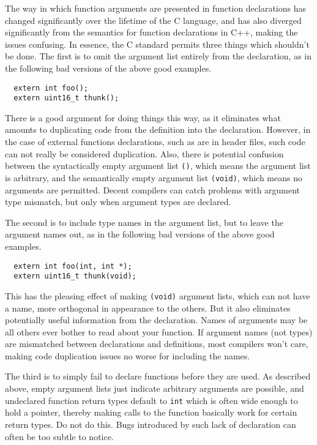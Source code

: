 \documentclass{lulu}
\newcommand{\code}[1]{\texttt{#1}\xspace}
\begin{document}
The way in which function arguments are presented in function
declarations has changed significantly over the lifetime of the C
language, and has also diverged significantly from the semantics for
function declarations in C++, making the issues confusing.  In
essence, the C standard permits three things which shouldn't be done.
The first is to omit the argument list entirely from the declaration,
as in the following bad versions of the above good examples.

\begin{samepage}
\begin{verbatim}
  extern int foo();
  extern uint16_t thunk();
\end{verbatim}
\end{samepage}

There is a good argument for doing things this way, as it eliminates
what amounts to duplicating code from the definition into the
declaration.  However, in the case of external functions declarations,
such as are in header files, such code can not really be considered
duplication.  Also, there is potential confusion between the
syntactically empty argument list \code{()}, which means the argument
list is arbitrary, and the semantically empty argument list
\code{(void)}, which means no arguments are permitted.  Decent
compilers can catch problems with argument type mismatch, but only
when argument types are declared.

The second is to include type names in the argument list, but to leave
the argument names out, as in the following bad versions of the above
good examples.

\begin{samepage}
\begin{verbatim}
  extern int foo(int, int *);
  extern uint16_t thunk(void);
\end{verbatim}
\end{samepage}

This has the pleasing effect of making \code{(void)} argument lists,
which can not have a name, more orthogonal in appearance to the
others.  But it also eliminates potentially useful information from
the declaration.  Names of arguments may be all others ever bother to
read about your function.  If argument names (not types) are
mismatched between declarations and definitions, most compilers won't
care, making code duplication issues no worse for including the names.

The third is to simply fail to declare functions before they are used.
As described above, empty argument lists just indicate arbitrary
arguments are possible, and undeclared function return types default
to \code{int} which is often wide enough to hold a pointer, thereby
making calls to the function basically work for certain return types.
Do not do this.  Bugs introduced by such lack of declaration can often
be too subtle to notice.
\end{document}
